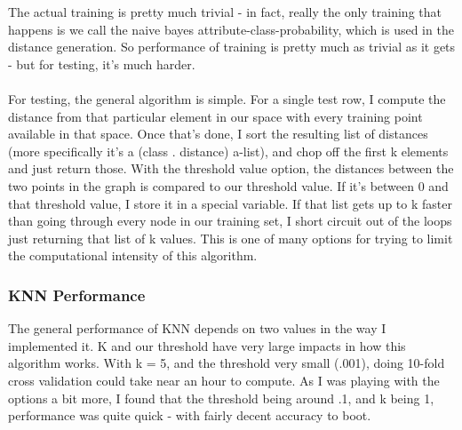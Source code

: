 \documentclass{article}
\begin{document}
The actual training is pretty much trivial - in fact, really the only training that happens is we call the naive bayes attribute-class-probability, which is used in the distance generation.  So performance of training is pretty much as trivial as it gets - but for testing, it's much harder.\\
\\
For testing, the general algorithm is simple. For a single test row, I compute the distance from that particular element in our space with every training point available in that space.  Once that's done, I sort the resulting list of distances (more specifically it's a (class . distance) a-list), and chop off the first k elements and just return those.  With the threshold value option, the distances between the two points in the graph is compared to our threshold value.  If it's between 0 and that threshold value, I store it in a special variable.  If that list gets up to k faster than going through every node in our training set, I short circuit out of the loops just returning that list of k values.  This is one of many options for trying to limit the computational intensity of this algorithm.  
\subsubsection{KNN Performance}
The general performance of KNN depends on two values in the way I implemented it.  K and our threshold have very large impacts in how this algorithm works.  With k = 5, and the threshold very small (.001), doing 10-fold cross validation could take near an hour to compute.  As I was playing with the options a bit more, I found that the threshold being around .1, and k being 1, performance was quite quick - with fairly decent accuracy to boot.  
\end{document}
